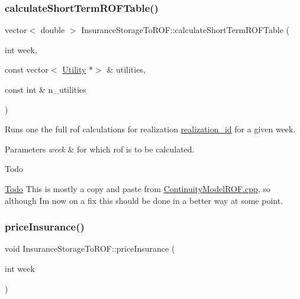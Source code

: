 \subsubsection{\texorpdfstring{calculate\+Short\+Term\+R\+O\+F\+Table()}{calculateShortTermROFTable()}}
{\footnotesize\ttfamily vector$<$ double $>$ Insurance\+Storage\+To\+R\+O\+F\+::calculate\+Short\+Term\+R\+O\+F\+Table (\begin{DoxyParamCaption}\item[{int}]{week,  }\item[{const vector$<$ \mbox{\hyperlink{classUtility}{Utility}} $\ast$$>$ \&}]{utilities,  }\item[{const int \&}]{n\+\_\+utilities }\end{DoxyParamCaption})}

Runs one the full rof calculations for realization \mbox{\hyperlink{classContinuityModel_a7b6c99bf256f6c6b633ebb78282f43c7_a7b6c99bf256f6c6b633ebb78282f43c7}{realization\+\_\+id}} for a given week. 
\begin{DoxyParams}{Parameters}
{\em week} & for which rof is to be calculated. \\
\hline
\end{DoxyParams}
\begin{DoxyRefDesc}{Todo}
\item[\mbox{\hyperlink{todo__todo000002}{Todo}}]This is mostly a copy and paste from \mbox{\hyperlink{ContinuityModelROF_8cpp}{Continuity\+Model\+R\+O\+F.\+cpp}}, so although I\textquotesingle{}m now on a fix this should be done in a better way at some point. \end{DoxyRefDesc}
\mbox{\label{classInsuranceStorageToROF_a2519f93b9db551105d9a7913d0db9540_a2519f93b9db551105d9a7913d0db9540}} 
\subsubsection{\texorpdfstring{price\+Insurance()}{priceInsurance()}}
{\footnotesize\ttfamily void Insurance\+Storage\+To\+R\+O\+F\+::price\+Insurance (\begin{DoxyParamCaption}\item[{int}]{week }\end{DoxyParamCaption})}


